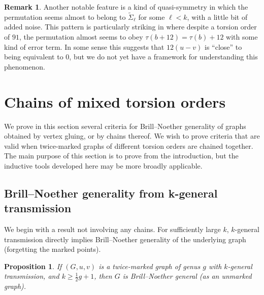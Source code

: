 \documentclass[11pt]{article}
\newtheorem{prop}[theo]{Proposition}
\theoremstyle{definition}
\newtheorem{rema}[theo]{Remark}
\numberwithin{equation}{section}
\newcommand{\eaf}[1]{\widetilde{\Sigma}_{#1}}
\begin{document}
\begin{rema}
    Another notable feature is a kind of quasi-symmetry in which the permutation seems almost to belong to $\eaf{\ell}$ for some $\ell<k$, with a little bit of added noise. This pattern is particularly striking in  where despite a torsion order of $91$, the permutation almost seems to obey $\tau(b+12) = \tau(b)+12$ with some kind of error term. In some sense this suggests that $12(u-v)$ is ``close'' to being equivalent to $0$, but we do not yet have a framework for understanding this phenomenon.
\end{rema}

\section{Chains of mixed torsion orders}
\label{sec:mixedTorsion}

We prove in this section several criteria for Brill--Noether generality of graphs obtained by vertex gluing, or by chains thereof. We wish to prove criteria that are valid when twice-marked graphs of different torsion orders are chained together. The main purpose of this section is to prove  from the introduction, but the inductive tools developed here may be more broadly applicable.

\subsection{Brill--Noether generality from k-general transmission}

We begin with a result not involving any chains. For sufficiently large $k$, $k$-general transmission directly implies Brill--Noether generality of the underlying graph (forgetting the marked points).

\begin{prop}\label{prop:kgt-bngenl}
If $(G,u,v)$ is a twice-marked graph of genus $g$ with $k$-general transmission, and $k \geq \frac12 g + 1$, then $G$ is Brill--Noether general (as an unmarked graph).
\end{prop}
\end{document}
